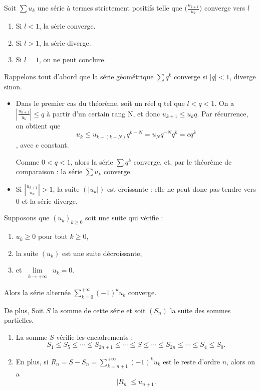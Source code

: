 \documentclass[french]{yLectureNote}
\newcommand{\Lim}[1]{\lim\limits_{\substack{#1}}\:}
\begin{document}
\begin{theorem}
Soit $\sum u_k$ une série à termes strictement positifs telle que \(\big(\frac{u_{k+1}}{u_{k}}\big)\) converge vers \(l\)
\begin{enumerate}
\item Si \(l < 1\), la série converge.
\item Si \(l > 1\), la série diverge.
\item Si \(l = 1\), on ne peut conclure.
\end{enumerate}
\end{theorem}
\begin{myproof}
Rappelons tout d'abord que la série géométrique $\sum q^k$
converge si $|q|<1$, diverge sinon.
\begin{itemize}
 \item Dans le premier cas du théorème, soit un réel q tel que \(l<q<1\). On a $\left|\frac{u_{k+1}}{u_k}\right| \leq q$ à partir d'un certain rang N, et donc \(u_{k+1}\leq u_kq\). Par récurrence, on obtient que \[u_k \leq u_{k-(k-N)}q^{k-N}=u_Nq^{-N}q^k=cq^k\], avec c constant.

Comme $0 < q < 1$, alors la série $\sum q^k$ converge, et,
par le théorème de comparaison :
la série $\sum u_k$ converge.
 \item Si $\left|\frac{u_{k+1}}{u_k}\right| > 1$, la suite $(|u_k|)$ est croissante : elle ne
peut donc pas tendre vers $0$ et la série diverge.
\end{itemize}
\end{myproof}
\begin{theorem}
Supposons que $(u_k)_{k\ge0}$ soit une suite qui vérifie :
\begin{enumerate}
  \item $u_k  \ge 0$ pour tout $k \ge 0$,
  \item la suite $(u_k)$ est une suite décroissante,
  \item et $\Lim{k\to+\infty} u_k=0$.
\end{enumerate}
Alors la série alternée $\displaystyle \sum_{k=0}^{+\infty} (-1)^k u_k$ converge.

De plus, Soit $S$ la somme de cette série et soit $(S_n)$ la suite des sommes partielles.
\begin{enumerate}
  \item La somme $S$ vérifie les encadrements :
  $$ S_1\le S_5\le \cdots \le S_{2n+1} \le \cdots \le S
  \le  \cdots\le S_{2n} \le \cdots\le S_4\le S_0.$$
  \item En plus, si $\displaystyle R_n=S-S_n =\sum_{k=n+1}^{+\infty} (-1)^k u_k$ est le reste d'ordre $n$, alors on  a
$$\big|R_n\big|\le u_{n+1}.$$
\end{enumerate}
\end{theorem}
\end{document}
